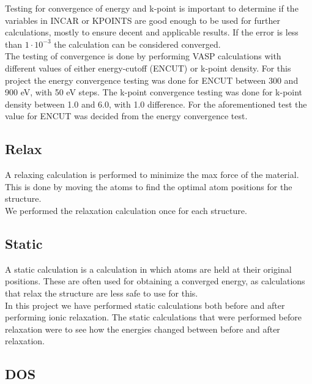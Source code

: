\documentclass{article}
\begin{document}
    Testing for convergence of energy and k-point is important to determine if the variables in INCAR or KPOINTS are good enough to be used for further calculations, mostly to ensure decent and applicable results. If the error is less than $1\cdot 10^{-3}$ the calculation can be considered converged. \\

    The testing of convergence is done by performing VASP calculations with different values of either energy-cutoff (ENCUT) or k-point density. For this project the energy convergence testing was done for ENCUT between 300 and 900 eV, with 50 eV steps. The k-point convergence testing was done for k-point density between 1.0 and 6.0, with 1.0 difference. For the aforementioned test the value for ENCUT was decided from the energy convergence test. \\


  \subsection{Relax}

    A relaxing calculation is performed to minimize the max force of the material. This is done by moving the atoms to find the optimal atom positions for the structure. \\

    We performed the relaxation calculation once for each structure. \\


  \subsection{Static}

    A static calculation is a calculation in which atoms are held at their original positions. These are often used for obtaining a converged energy, as calculations that relax the structure are less safe to use for this.\\

    In this project we have performed static calculations both before and after performing ionic relaxation. The static calculations that were performed before relaxation were to see how the energies changed between before and after relaxation. \\


  \subsection{DOS}
\end{document}
